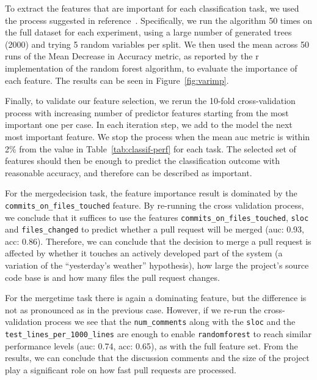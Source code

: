 \documentclass{sig-alternate}
\begin{document}
To extract the features that are important for each classification task, we
used the process suggested in reference~\cite{Genue10}. Specifically, we run
the algorithm 50 times on the full dataset for each experiment, using a large
number of generated trees (2000) and trying 5 random variables per split. We
then used the mean across 50 runs of the  Mean Decrease in Accuracy metric, as
reported by the {\sc r} implementation of the random forest algorithm, to
evaluate the importance of each feature. The results can be seen in
Figure~\ref{fig:varimp}.

Finally, to validate our feature selection, we rerun the 10-fold
cross-validation process with increasing number of predictor features starting
from the most important one per case.
In each iteration step, we add to the model the next most important feature.
We stop the process when the mean {\sc
auc} metric is within 2\% from the value in Table~\ref{tab:classif-perf} for
each task. The selected set of features should then be enough to predict the
classification outcome with reasonable accuracy, and therefore can be described
as important.

For the \textsf{mergedecision} task, the feature importance result is dominated
by the \texttt{commits\_\-on\_\-files\_\-touched} feature. By re-running the cross
validation process, we conclude that it suffices to use the features
 \texttt{commits\_\-on\_\-files\_\-touched}, \texttt{sloc} and \texttt{files\_changed}
to predict whether a pull request will be merged ({\sc auc:} 0.93, {\sc acc}:
0.86). Therefore, we can conclude that the decision to merge a pull request is
affected by whether it touches an actively developed part of the system (a
variation of the ``yesterday's weather'' hypothesis), how large the project's
source code base is and how many files the pull request changes.


For the \textsf{mergetime} task there is again a dominating feature, but the
difference is not as pronounced as in the previous case. However, if we re-run
the cross-validation process we see that the \texttt{num\_comments} along with
the \texttt{sloc} and the \texttt{test\_lines\_per\_1000\_lines} are enough to
enable \texttt{randomforest} to reach similar performance levels ({\sc auc:}
0.74, {\sc acc}: 0.65), as with the full feature set. From the results, we can
conclude that the discussion comments and the size of the project play a
significant role on how fast pull requests are processed. 
\end{document}
